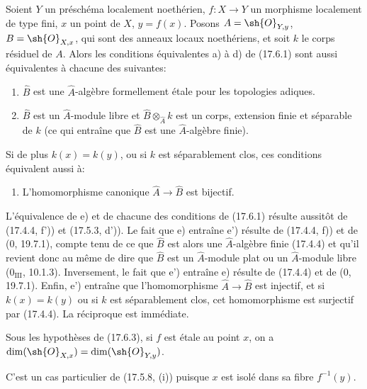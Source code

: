 \begin{proposition}[17.6.3]
\label{IV.17.6.3}
Soient $Y$ un préschéma localement noethérien, $f:X\to Y$ un morphisme localement de type fini, $x$ un point de $X$, $y=f(x)$. Posons $A=\sh{O}_{Y,y}$, $B=\sh{O}_{X,x}$, qui sont des anneaux locaux noethériens, et soit $k$ le corps résiduel de $A$. Alors les conditions équivalentes a) à d) de (17.6.1) sont aussi équivalentes à chacune des suivantes:
\begin{enumerate}
  \item[e)] $\widehat B$ est une $\widehat A$-algèbre formellement étale pour les topologies adiques.
  \item[e')] $\widehat B$ est un $\widehat A$-module libre et $\widehat B\otimes_{\widehat A}k$ est un corps, extension finie et séparable de $k$ (ce qui entraîne que $\widehat B$ est une $\widehat A$-algèbre finie).
\end{enumerate}
Si de plus $k(x)=k(y)$, ou si $k$ est séparablement clos, ces conditions équivalent aussi à:
\begin{enumerate}
  \item[e'')] L'homomorphisme canonique $\widehat A\to\widehat B$ est bijectif.
\end{enumerate}
\end{proposition}

L'équivalence de e) et de chacune des conditions de (17.6.1) résulte aussitôt de (17.4.4, f')) et (17.5.3, d')). Le fait que e) entraîne e') résulte de (17.4.4, f)) et de (0, 19.7.1), compte tenu de ce que $\widehat B$ est alors une $\widehat A$-algèbre finie (17.4.4) et qu'il revient donc au même de dire que $\widehat B$ est un $\widehat A$-module plat ou un $\widehat A$-module libre ($0_{\mathrm{III}}$, 10.1.3). Inversement, le fait que e') entraîne e) résulte de (17.4.4) et de (0, 19.7.1). Enfin, e') entraîne que l'homomorphisme $\widehat A\to\widehat B$ est injectif, et si $k(x)=k(y)$ ou si $k$ est séparablement clos, cet homomorphisme est surjectif par (17.4.4). La réciproque est immédiate.

\begin{proposition}[17.6.4]
\label{IV.17.6.4}
Sous les hypothèses de (17.6.3), si $f$ est étale au point $x$, on a $\dim(\sh{O}_{X,x})=\dim(\sh{O}_{Y,y})$.
\end{proposition}

C'est un cas particulier de (17.5.8, (i)) puisque $x$ est isolé dans sa fibre $f^{-1}(y)$.


